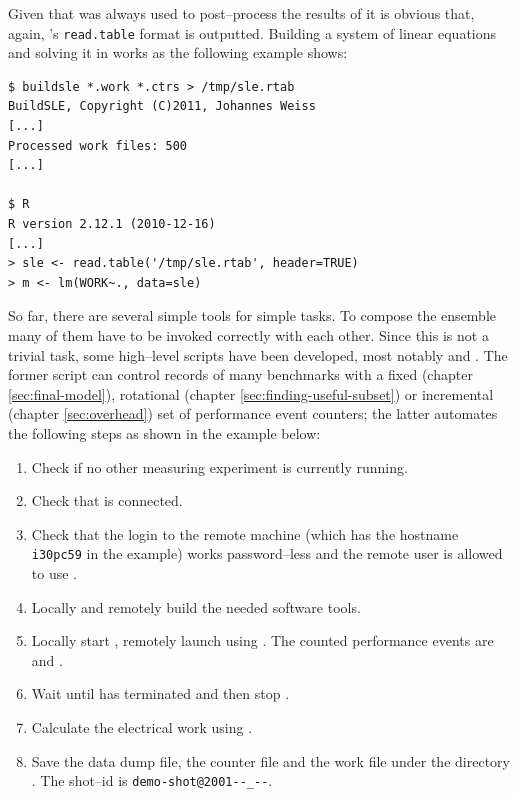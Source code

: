 Given that \JWTR{} was always used to post--process the results of \JWTbsle{}
it is obvious that, again, \JWTR's \texttt{read.table} \cite{r11data} format is
outputted. Building a system of linear equations and solving it in \JWTR{}
works as the following example shows:

\begin{lstlisting}[style=Shell]
$ buildsle *.work *.ctrs > /tmp/sle.rtab
BuildSLE, Copyright (C)2011, Johannes Weiss
[...]
Processed work files: 500
[...]

$ R
R version 2.12.1 (2010-12-16)
[...]
> sle <- read.table('/tmp/sle.rtab', header=TRUE)
> m <- lm(WORK~., data=sle)
\end{lstlisting}



So far, there are several simple tools for simple tasks. To compose the ensemble
many of them have to be invoked correctly with each other. Since this is not a
trivial task, some high--level scripts have been developed, most notably
 and \JWTdomeasuring{}.  The
former script can control records of many benchmarks with a fixed (chapter
\ref{sec:final-model}), rotational (chapter \ref{sec:finding-useful-subset}) or
incremental (chapter \ref{sec:overhead}) set of performance event counters; the
latter automates the following steps as shown in the example below:

\begin{enumerate}

\item Check if no other measuring experiment is currently running.

\item Check that \JWPni{} is connected.

\item Check that the login to the remote machine (which has the hostname
\texttt{i30pc59} in the example) works
password--less and the remote user is allowed to use .

\item Locally and remotely build the needed software tools.

\item Locally start \JWTdd{}, remotely launch  using \JWTdc{}.
The counted performance events are \JWctrCLK{} and \JWctrINST{}.

\item Wait until  has terminated and then stop \JWTdd{}.

\item Calculate the electrical work using \JWTfcw{}.

\item Save the data dump file, the counter file and the work file under the
directory . The shot--id is
\texttt{demo-\-shot\-@2001--\_--}.

\end{enumerate}

